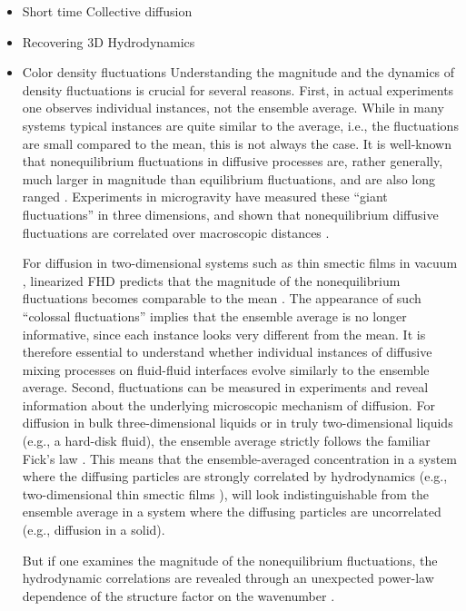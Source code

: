 \documentclass[ twoside,openright,titlepage,numbers=noenddot,%
headinclude,footinclude,cleardoublepage=empty,abstract=on,
BCOR=5mm,paper=a4,fontsize=11pt, dvipsnames
]{scrreprt}
\begin{document}
\begin{itemize}
\item Short time Collective diffusion
\item Recovering 3D Hydrodynamics
\item Color density fluctuations
  Understanding the magnitude and the dynamics of density fluctuations is crucial for several reasons. First, in actual experiments one observes individual instances, not the ensemble average. While in many systems typical instances are quite similar to the average, i.e., the fluctuations are small compared to the mean, this is not always the case. It is well-known that nonequilibrium fluctuations in diffusive processes are, rather generally, much larger in magnitude than equilibrium fluctuations, and are also long ranged \cite{FluctHydroNonEq_Book}.
Experiments in microgravity have measured these ``giant fluctuations'' in three dimensions, and shown that nonequilibrium diffusive fluctuations are correlated over macroscopic distances \cite{FractalDiffusion_Microgravity,GRADFLEXTransient}.

For diffusion in two-dimensional systems such as thin smectic films in vacuum \cite{ThinFilms_True2D}, linearized FHD predicts that the magnitude of the nonequilibrium fluctuations becomes comparable to the mean \cite{GiantFluctuations_ThinFilms}. The appearance of such ``colossal fluctuations'' implies that the ensemble average is no longer informative, since each instance looks very different from the mean.
It is therefore essential to understand whether individual instances of diffusive mixing processes on fluid-fluid interfaces evolve similarly to the ensemble average.
Second, fluctuations can be measured in experiments and reveal information about the underlying microscopic mechanism of diffusion. For diffusion in bulk three-dimensional liquids or in truly two-dimensional liquids (e.g., a hard-disk fluid), the ensemble average strictly follows the familiar Fick's law \cite{DiffusionJSTAT}.
This means that the ensemble-averaged concentration in a system where the diffusing particles are strongly correlated by hydrodynamics (e.g., two-dimensional thin smectic films \cite{ThinFilms_HIs}), will look indistinguishable from the ensemble average in a system where the diffusing particles are uncorrelated (e.g., diffusion in a solid).

But if one examines the magnitude of the nonequilibrium fluctuations, the hydrodynamic correlations are revealed through an unexpected power-law dependence of the structure factor on the wavenumber \cite{GiantFluctuations_ThinFilms}.


\end{itemize}
\end{document}
